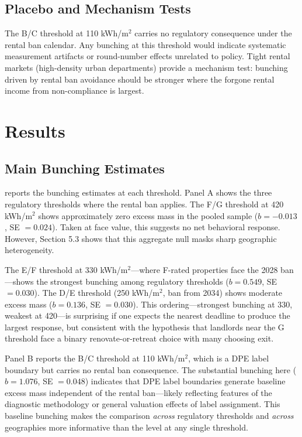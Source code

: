 \documentclass[12pt]{article}
\begin{document}
\subsection{Placebo and Mechanism Tests}

The B/C threshold at 110 kWh/m$^2$ carries no regulatory consequence under the rental ban calendar. Any bunching at this threshold would indicate systematic measurement artifacts or round-number effects unrelated to policy. Tight rental markets (high-density urban departments) provide a mechanism test: bunching driven by rental ban avoidance should be stronger where the forgone rental income from non-compliance is largest.


\section{Results}

\subsection{Main Bunching Estimates}



 reports the bunching estimates at each threshold. Panel A shows the three regulatory thresholds where the rental ban applies. The F/G threshold at 420 kWh/m$^2$ shows approximately zero excess mass in the pooled sample ($b = -0.013$, SE $= 0.024$). Taken at face value, this suggests no net behavioral response. However, Section 5.3 shows that this aggregate null masks sharp geographic heterogeneity.

The E/F threshold at 330 kWh/m$^2$---where F-rated properties face the 2028 ban---shows the strongest bunching among regulatory thresholds ($b = 0.549$, SE $= 0.030$). The D/E threshold (250 kWh/m$^2$, ban from 2034) shows moderate excess mass ($b = 0.136$, SE $= 0.030$). This ordering---strongest bunching at 330, weakest at 420---is surprising if one expects the nearest deadline to produce the largest response, but consistent with the hypothesis that landlords near the G threshold face a binary renovate-or-retreat choice with many choosing exit.

Panel B reports the B/C threshold at 110 kWh/m$^2$, which is a DPE label boundary but carries no rental ban consequence. The substantial bunching here ($b = 1.076$, SE $= 0.048$) indicates that DPE label boundaries generate baseline excess mass independent of the rental ban---likely reflecting features of the diagnostic methodology or general valuation effects of label assignment. This baseline bunching makes the comparison \textit{across} regulatory thresholds and \textit{across} geographies more informative than the level at any single threshold.
\end{document}
